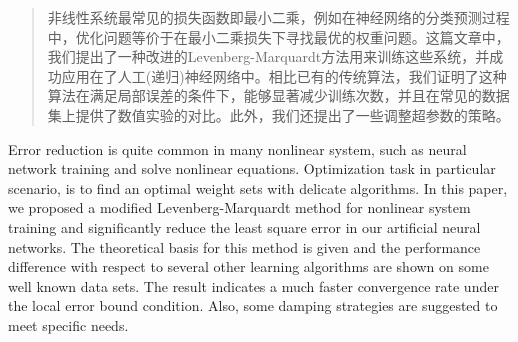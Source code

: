 
\begin{abstract}

非线性系统最常见的损失函数即最小二乘，例如在神经网络的分类预测过程中，优化问题等价于在最小二乘损失下寻找最优的权重问题。这篇文章中，我们提出了一种改进的Levenberg-Marquardt方法用来训练这些系统，并成功应用在了人工(递归)神经网络中。相比已有的传统算法，我们证明了这种算法在满足局部误差的条件下，能够显著减少训练次数，并且在常见的数据集上提供了数值实验的对比。此外，我们还提出了一些调整超参数的策略。

\end{abstract}

\begin{englishabstract}

Error reduction is quite common in many nonlinear system, such as neural network training and solve nonlinear equations. Optimization task in particular scenario, is to find an optimal weight sets with delicate algorithms. In this paper, we proposed a modified Levenberg-Marquardt method for nonlinear system training and significantly reduce the least square error in our artificial neural networks. The theoretical basis for this method is given and the performance difference with respect to several other learning algorithms are shown on some well known data sets. The result indicates a much faster convergence rate under the local error bound condition. Also, some damping strategies are suggested to meet specific needs.

\end{englishabstract}

